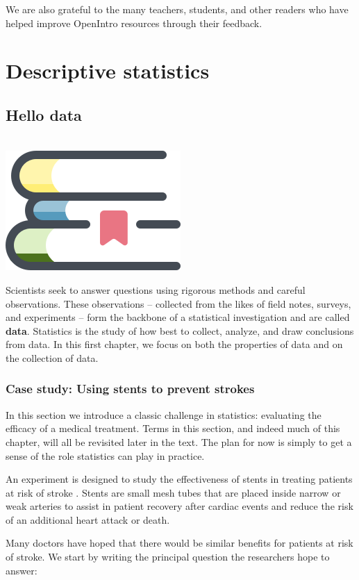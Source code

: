\documentclass[
  10pt,
  openany]{book}
\newenvironment{mdframedwithfootChapterintro}
{   
    \savenotes
    \begin{mdframed}[%
    topline=true, bottomline=true, linecolor=oiB, linewidth=1.4pt,
    rightline=false, leftline=false,
    backgroundcolor=oiLB]
    \renewcommand{\thempfootnote}{\arabic{footnote}}
    }
{
    \end{mdframed}
    \spewnotes
}
\newenvironment{chapterintro}{
\vspace{4mm}
\begin{mdframedwithfootChapterintro}
\begin{minipage}[t]{0.10\textwidth}
{$\:$ \\ \setkeys{Gin}{width=2.5em,keepaspectratio}\includegraphics{images/_icons/chapterintro.png}}
\end{minipage}
\hfill
\begin{minipage}[t]{0.90\textwidth}
\setlength{\parskip}{1em}
\large
}{\end{minipage}
\end{mdframedwithfootChapterintro}
\vspace{4mm}
}
\begin{document}
We are also grateful to the many teachers, students, and other readers who have helped improve OpenIntro resources through their feedback.

\hypertarget{part-descriptive-statistics}{%
\part{Descriptive statistics}\label{part-descriptive-statistics}}

\hypertarget{data-hello}{%
\chapter{Hello data}\label{data-hello}}

\begin{chapterintro}
Scientists seek to answer questions using rigorous methods and careful observations.
These observations -- collected from the likes of field notes, surveys, and experiments -- form the backbone of a statistical investigation and are called \textbf{data}.
Statistics is the study of how best to collect, analyze, and draw conclusions from data.
In this first chapter, we focus on both the properties of data and on the collection of data.

\end{chapterintro}

\hypertarget{case-study-stents-strokes}{%
\section{Case study: Using stents to prevent strokes}\label{case-study-stents-strokes}}

In this section we introduce a classic challenge in statistics: evaluating the efficacy of a medical treatment.
Terms in this section, and indeed much of this chapter, will all be revisited later in the text.
The plan for now is simply to get a sense of the role statistics can play in practice.

An experiment is designed to study the effectiveness of stents in treating patients at risk of stroke \citep{chimowitz2011stenting}.
Stents are small mesh tubes that are placed inside narrow or weak arteries to assist in patient recovery after cardiac events and reduce the risk of an additional heart attack or death.

Many doctors have hoped that there would be similar benefits for patients at risk of stroke.
We start by writing the principal question the researchers hope to answer:
\end{document}
